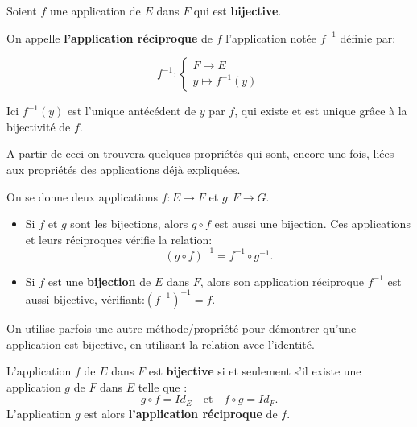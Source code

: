 \documentclass{article}
\begin{document}
\begin{tcolorbox}[colback=red!5!white,colframe=red!75!black,title=Définition 3.7]

Soient $f$ une application de $E$ dans $F$ qui est \textbf{bijective}.

On appelle \textbf{l'application réciproque} de  $f$ l'application notée $f^{-1}$ définie par:

\[ 
f^{-1} :
\begin{cases}
F \to E \\ 
y \mapsto f^{-1}(y)
\end{cases}
\]

Ici $f^{-1}(y)$ est l'unique antécédent de $y$ par $f$, qui existe et est unique grâce à la bijectivité de $f$.

\end{tcolorbox}


A partir de ceci on trouvera quelques propriétés qui sont, encore une fois, liées aux propriétés des applications déjà expliquées.

\begin{tcolorbox}[colback=blue!5!white,colframe=blue!75!black,title=Propriété 3.3]



On se donne deux applications $f : E \to F$ et $g : F \to G$.

\begin{itemize}
    \item Si $f$ et $g$ sont les bijections, alors $g \circ f$ est aussi une bijection. Ces applications et leurs réciproques vérifie la relation: 
    \[
    (g \circ f)^{-1} = f^{-1} \circ g^{-1}.
    \]

    \item Si $f$ est une \textbf{bijection} de $E$ dans $F$, alors son application réciproque $f^{-1}$ est aussi bijective, vérifiant:$(f^{-1})^{-1} = f$.

\end{itemize}



\end{tcolorbox} 


On utilise parfois une autre méthode/propriété pour démontrer qu'une application est bijective, en utilisant la relation avec l'identité.

\begin{tcolorbox}[colback=blue!5!white,colframe=blue!75!black,title=Propriété 3.4]


L'application $f$ de $E$ dans $F$ est \textbf{bijective} si et seulement s’il existe une application $g$ de $F$ dans $E$ telle que :
\[
g \circ f = Id_E \quad \text{et} \quad f \circ g = Id_F.
\]
L’application $g$ est alors \textbf{l'application réciproque} de $f$.


\end{tcolorbox} 
\end{document}
